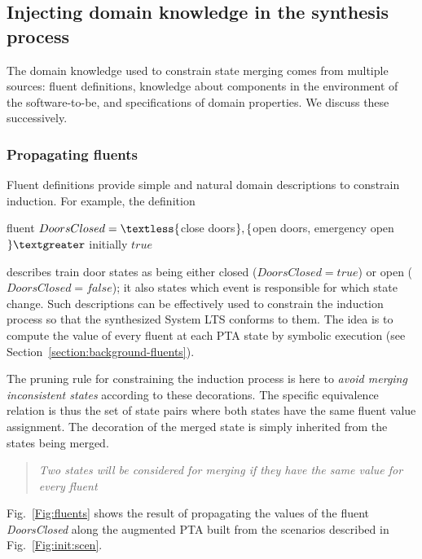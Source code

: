
\subsection{Injecting domain knowledge in the synthesis process\label{subsection:induction-pruning-with-domain-knowledge}}

The domain knowledge used to constrain state merging comes from multiple sources: fluent definitions, knowledge about components in the environment of the software-to-be, and specifications of domain properties. We discuss these successively.


\subsubsection*{Propagating fluents}

Fluent definitions provide simple and natural domain descriptions to constrain induction. For example, the definition

\begin{center}
fluent $DoorsClosed = \textless \{$close doors$\}, \newline
 \{$open doors, emergency open$\} \textgreater $ initially $true$ \\
\end{center}

\noindent describes train door states as being either closed ($DoorsClosed = true$) or open ($DoorsClosed = false$); it also states which event is responsible for which state change. Such descriptions can be effectively used to constrain the induction process so that the synthesized System LTS conforms to them. The idea is to compute the value of every fluent at each PTA state by symbolic execution (see Section~\ref{section:background-fluents}). 

The pruning rule for constraining the induction process is here to \emph{avoid merging inconsistent states} according to these decorations. The specific equivalence relation is thus the set of state pairs where both states have the same fluent value assignment. The decoration of the merged state is simply inherited from the states being merged.
\begin{quote}
\emph{Two states will be considered for merging if they have the same value for every fluent}
\end{quote}

Fig.~\ref{Fig:fluents} shows the result of propagating the values of the fluent \emph{DoorsClosed} along the augmented PTA built from the scenarios described in Fig.~\ref{Fig:init:scen}.


